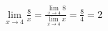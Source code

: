 \begin{ex}
\begin{align}
&\lim_{x\rightarrow 4} \frac{8}{x}=\frac{\lim_{x\rightarrow 4} 8}{\lim_{x\rightarrow 4} x}=\frac{8}{4}=2\nonumber
\end{align}
\end{ex}